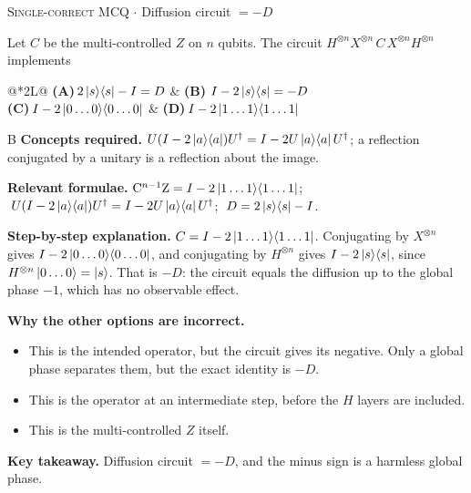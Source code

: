 \documentclass[11pt,a4paper]{article}
\newcommand{\optlabel}[1]{\textbf{(#1)}}
\newcommand{\correctlabel}[1]{\textcolor{okgreen}{\textbf{(#1)}\,\ding{51}}}
\newenvironment{qitem}[1]{\begin{list}{}{\setlength{\leftmargin}{3.3em}\setlength{\labelwidth}{3.1em}%
  \setlength{\labelsep}{0.2em}\setlength{\topsep}{3pt}\setlength{\parsep}{3pt}}\item[\textbf{Q.#1}\hfill]}{\end{list}}
\newcommand{\qsep}{\par\vspace{2pt}{\color{black!15}\hrule}\vspace{4pt}}
\newcommand{\qmeta}[2]{{\footnotesize\color{black!60}\textsc{#1} \;$\cdot$\; #2}\par}
\begin{document}
\begin{qitem}{47}
\qmeta{Single-correct MCQ}{Diffusion circuit $= -D$}
Let $C$ be the multi-controlled $Z$ on $n$ qubits. The circuit $H^{\otimes n}X^{\otimes n}\,C\,X^{\otimes n}H^{\otimes n}$ implements
\par\smallskip\noindent\begin{tabularx}{\linewidth}{@{}*{2}{L}@{}}
\optlabel{A}\,$2\ket{s}\!\bra{s} - I = D$ & \correctlabel{B}\,$I - 2\ket{s}\!\bra{s} = -D$ \\[3pt]
\optlabel{C}\,$I - 2\ket{0\dots0}\!\bra{0\dots0}$ & \optlabel{D}\,$I - 2\ket{1\dots1}\!\bra{1\dots1}$
\end{tabularx}
\end{qitem}
\begin{solbox}{B}
\textbf{\color{brand}Concepts required.} $U(I - 2\ket{a}\!\bra{a})U^\dagger = I - 2U\ket{a}\!\bra{a}U^\dagger$; a reflection conjugated by a unitary is a reflection about the image.

\textbf{\color{brand}Relevant formulae.} $\mathrm{C}^{n-1}\mathrm{Z} = I - 2\ket{1\dots1}\!\bra{1\dots1}$; $\;U(I - 2\ket{a}\!\bra{a})U^\dagger = I - 2U\ket{a}\!\bra{a}U^\dagger$; $\;D = 2\ket{s}\!\bra{s} - I$.

\textbf{\color{brand}Step-by-step explanation.} $C = I - 2\ket{1\dots1}\!\bra{1\dots1}$. Conjugating by $X^{\otimes n}$ gives $I - 2\ket{0\dots0}\!\bra{0\dots0}$, and conjugating by $H^{\otimes n}$ gives $I - 2\ket{s}\!\bra{s}$, since $H^{\otimes n}\ket{0\dots0} = \ket{s}$.
That is $-D$: the circuit equals the diffusion up to the global phase $-1$, which has no observable effect.

\textbf{\color{brand}Why the other options are incorrect.}
\begin{itemize}[leftmargin=2.4em, itemsep=1pt, topsep=2pt]
\item[\textbf{(A)}] This is the intended operator, but the circuit gives its negative. Only a global phase separates them, but the exact identity is $-D$.
\item[\textbf{(C)}] This is the operator at an intermediate step, before the $H$ layers are included.
\item[\textbf{(D)}] This is the multi-controlled $Z$ itself.
\end{itemize}
\textbf{\color{brand}Key takeaway.} Diffusion circuit $= -D$, and the minus sign is a harmless global phase.
\end{solbox}
\qsep
\end{document}
